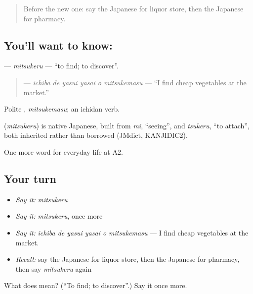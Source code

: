 \label{lesson:JA-C191-mitsukeru}



\begin{quote}
Before the new one: say the Japanese for liquor store, then the Japanese for pharmacy.
\end{quote}

\subsection*{You'll want to know: }
\textbf{} — \emph{mitsukeru} — \textquotedblleft{}to find; to discover\textquotedblright{}.

\begin{quote}
\textbf{   } — \emph{ichiba de yasui yasai o mitsukemasu} — \textquotedblleft{}I find cheap vegetables at the market.\textquotedblright{}
\end{quote}

Polite \textbf{}, \emph{mitsukemasu}; an ichidan verb.

\begin{cousinweb}
\textbf{} (\emph{mitsukeru}) is native Japanese, built from \emph{mi}, \textquotedblleft{}seeing\textquotedblright{}, and \emph{tsukeru}, \textquotedblleft{}to attach\textquotedblright{}, both inherited rather than borrowed (JMdict, KANJIDIC2).
\end{cousinweb}

\begin{grammarlens}[title={What you've built}]
One more word for everyday life at A2.
\end{grammarlens}

\subsection*{Your turn}
\begin{itemize}
\raggedright
  \item \emph{Say it:} \emph{mitsukeru}
  \item \emph{Say it:} \emph{mitsukeru}, once more
  \item \emph{Say it:} \emph{ichiba de yasui yasai o mitsukemasu} — I find cheap vegetables at the market.
  \item \emph{Recall:} say the Japanese for liquor store, then the Japanese for pharmacy, then say \emph{mitsukeru} again
\end{itemize}

\begin{tcolorbox}[breakable,colback=teal!4,colframe=teal!35!black,title={Before you move on}]
What does  mean? (\textquotedblleft{}To find; to discover\textquotedblright{}.) Say it once more.
\end{tcolorbox}

